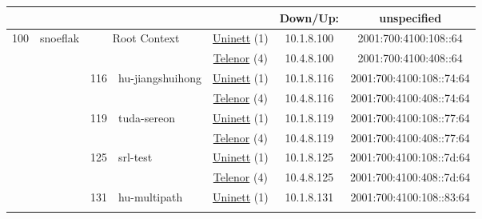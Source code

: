 \begin{small}
\begin{center}
\begin{longtable}{|c|c|c|c|c|c|c|c|}
  & \multicolumn{3}{|c|}{} & \multicolumn{2}{|c|}{} & Down/Up:  & unspecified \\ \hline
 \multirow{26}{*}{\tiny{100}} & \multicolumn{1}{|l|}{\multirow{26}{*}{\tiny{snoeflak}}} & \multicolumn{2}{|c|}{\multirow{2}{*}{\tiny{Root Context}}} & \multicolumn{2}{|c|}{\tiny{\href{https://www.uninett.no}{Uninett} (1)}} & \tiny{10.1.8.100} & \tiny{2001:700:4100:108::64} \\* \cline{5-5}\cline{6-6}\cline{7-7}\cline{8-8}
  &  & \multicolumn{2}{|c|}{} & \multicolumn{2}{|c|}{\tiny{\href{https://www.telenor.no}{Telenor} (4)}} & \tiny{10.4.8.100} & \tiny{2001:700:4100:408::64} \\* \cline{3-3}\cline{4-4}\cline{5-5}\cline{6-6}\cline{7-7}\cline{8-8}
  &  & \multirow{2}{*}{\tiny{116}} & \multicolumn{1}{|l|}{\multirow{2}{*}{\tiny{hu-jiangshuihong}}} & \multicolumn{2}{|c|}{\tiny{\href{https://www.uninett.no}{Uninett} (1)}} & \tiny{10.1.8.116} & \tiny{2001:700:4100:108::74:64} \\* \cline{5-5}\cline{6-6}\cline{7-7}\cline{8-8}
  &  &  &  & \multicolumn{2}{|c|}{\tiny{\href{https://www.telenor.no}{Telenor} (4)}} & \tiny{10.4.8.116} & \tiny{2001:700:4100:408::74:64} \\* \cline{3-3}\cline{4-4}\cline{5-5}\cline{6-6}\cline{7-7}\cline{8-8}
  &  & \multirow{2}{*}{\tiny{119}} & \multicolumn{1}{|l|}{\multirow{2}{*}{\tiny{tuda-sereon}}} & \multicolumn{2}{|c|}{\tiny{\href{https://www.uninett.no}{Uninett} (1)}} & \tiny{10.1.8.119} & \tiny{2001:700:4100:108::77:64} \\* \cline{5-5}\cline{6-6}\cline{7-7}\cline{8-8}
  &  &  &  & \multicolumn{2}{|c|}{\tiny{\href{https://www.telenor.no}{Telenor} (4)}} & \tiny{10.4.8.119} & \tiny{2001:700:4100:408::77:64} \\* \cline{3-3}\cline{4-4}\cline{5-5}\cline{6-6}\cline{7-7}\cline{8-8}
  &  & \multirow{2}{*}{\tiny{125}} & \multicolumn{1}{|l|}{\multirow{2}{*}{\tiny{srl-test}}} & \multicolumn{2}{|c|}{\tiny{\href{https://www.uninett.no}{Uninett} (1)}} & \tiny{10.1.8.125} & \tiny{2001:700:4100:108::7d:64} \\* \cline{5-5}\cline{6-6}\cline{7-7}\cline{8-8}
  &  &  &  & \multicolumn{2}{|c|}{\tiny{\href{https://www.telenor.no}{Telenor} (4)}} & \tiny{10.4.8.125} & \tiny{2001:700:4100:408::7d:64} \\* \cline{3-3}\cline{4-4}\cline{5-5}\cline{6-6}\cline{7-7}\cline{8-8}
  &  & \multirow{2}{*}{\tiny{131}} & \multicolumn{1}{|l|}{\multirow{2}{*}{\tiny{hu-multipath}}} & \multicolumn{2}{|c|}{\tiny{\href{https://www.uninett.no}{Uninett} (1)}} & \tiny{10.1.8.131} & \tiny{2001:700:4100:108::83:64} \\* \cline{5-5}\cline{6-6}\cline{7-7}\cline{8-8}

\end{longtable}
\end{center}
\end{small}
